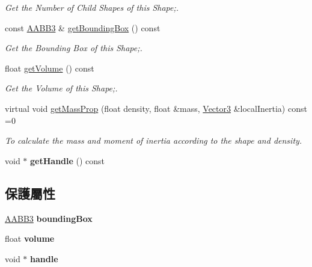 \begin{DoxyCompactItemize}
\begin{DoxyCompactList}\small\item\em Get the Number of Child Shapes of this Shape;. \end{DoxyCompactList}\item 
const \hyperlink{class_i_dream_sky_1_1_a_a_b_b3}{A\+A\+B\+B3} \& \hyperlink{class_i_dream_sky_1_1_shape3_a5704ab3fe88257e1f842720fe87cd201}{get\+Bounding\+Box} () const 
\begin{DoxyCompactList}\small\item\em Get the Bounding Box of this Shape;. \end{DoxyCompactList}\item 
float \hyperlink{class_i_dream_sky_1_1_shape3_a9b746b36c7cac8ee9d0a14af666d4800}{get\+Volume} () const 
\begin{DoxyCompactList}\small\item\em Get the Volume of this Shape;. \end{DoxyCompactList}\item 
virtual void \hyperlink{class_i_dream_sky_1_1_shape3_a069195b24c37ae47e01a6b195faf84e0}{get\+Mass\+Prop} (float density, float \&mass, \hyperlink{class_i_dream_sky_1_1_vector3}{Vector3} \&local\+Inertia) const  =0
\begin{DoxyCompactList}\small\item\em To calculate the mass and moment of inertia according to the shape and density. \end{DoxyCompactList}\item 
void $\ast$ {\bfseries get\+Handle} () const \hypertarget{class_i_dream_sky_1_1_shape3_a9832dc3490b5a022d49f2011373ba2af}{}\label{class_i_dream_sky_1_1_shape3_a9832dc3490b5a022d49f2011373ba2af}

\end{DoxyCompactItemize}
\subsection*{保護屬性}
\begin{DoxyCompactItemize}
\item 
\hyperlink{class_i_dream_sky_1_1_a_a_b_b3}{A\+A\+B\+B3} {\bfseries bounding\+Box}\hypertarget{class_i_dream_sky_1_1_shape3_acc37ca6fbae07b2136f010cdbe40b9fc}{}\label{class_i_dream_sky_1_1_shape3_acc37ca6fbae07b2136f010cdbe40b9fc}

\item 
float {\bfseries volume}\hypertarget{class_i_dream_sky_1_1_shape3_ace1f4491c3f8a6f19272b9cb0dd299e2}{}\label{class_i_dream_sky_1_1_shape3_ace1f4491c3f8a6f19272b9cb0dd299e2}

\item 
void $\ast$ {\bfseries handle}\hypertarget{class_i_dream_sky_1_1_shape3_ac922fbd9fdc499da1ddf5e2673473f9a}{}\label{class_i_dream_sky_1_1_shape3_ac922fbd9fdc499da1ddf5e2673473f9a}

\end{DoxyCompactItemize}


